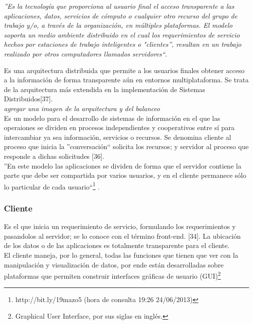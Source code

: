 \begin{center}
      \textit{''Es la tecnología que proporciona al usuario final el acceso transparente a las 
     aplicaciones, datos, servicios de cómputo o cualquier otro recurso del grupo de trabajo y/o, a través de la organización, 
     en múltiples plataformas. El modelo soporta un medio ambiente distribuido en el cual los requerimientos de servicio hechos 
     por estaciones de trabajo inteligentes o "clientes'', resultan en un trabajo realizado por otros computadores llamados 
     servidores``}.
\end{center}

Es una arquitectura distribuida que permite a los usuarios finales obtener acceso a la información de forma transparente aún en 
entornos multiplataforma. Se trata de la arquitectura más extendida en la implementación de Sistemas Distribuidos[37].\\

\textit{agregar una imagen de la arquitectura y del balanceo}\\

Es un modelo para el desarrollo de sistemas de información en el que las operaiones se dividen en procesos independientes y cooperativos
entre sí para intercambiar ya sea información, servicios o recursos. Se denomina cliente al proceso que inicia la ''conversación`` solicita 
los recursos; y servidor al proceso que responde a dichas solicitudes [36].\\ 

''En este modelo las aplicaciones se dividen de forma que el servidor contiene la parte que debe ser compartida por varios usuarios, y en el 
cliente permanece sólo lo particular de cada usuario``\footnote{http://bit.ly/19mazo5 (hora de consulta 19:26 24/06/2013)} .\\


\subsubsection{Cliente}

Es el que inicia un requerimiento de servicio, formulando los requerimientos y pasandolos al servidor;  se lo conoce con el término 
front-end. [34]. La ubicación de los datos o de las aplicaciones es totalmente transparente para el cliente.\\

El cliente maneja, por lo general, todas las funciones que tienen que ver con la manipulación y visualización de datos, por ende están 
desarrolladas sobre plataformas que permiten construir interfaces gráficas de usuario (GUI)\footnote{Graphical User Interface, por sus
siglas en inglés.}\\

